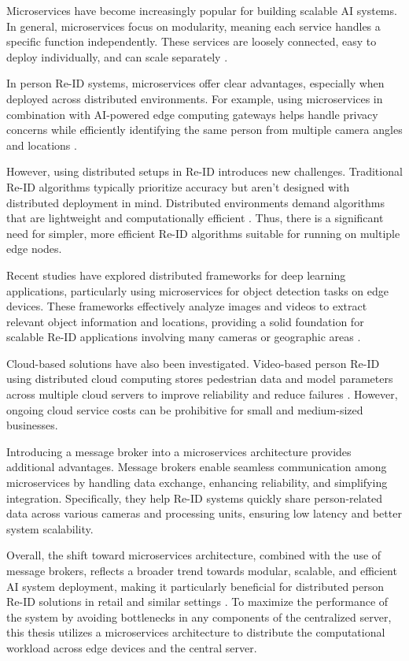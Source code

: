 \documentclass[../main.tex]{subfiles}
\begin{document}
Microservices have become increasingly popular for building scalable AI systems. In general, microservices focus on modularity, meaning each service handles a specific function independently. These services are loosely connected, easy to deploy individually, and can scale separately \cite{wiki2024_microservices}.

In person Re-ID systems, microservices offer clear advantages, especially when deployed across distributed environments. For example, using microservices in combination with AI-powered edge computing gateways helps handle privacy concerns while efficiently identifying the same person from multiple camera angles and locations \cite{mdpi2021_microservice}.

However, using distributed setups in Re-ID introduces new challenges. Traditional Re-ID algorithms typically prioritize accuracy but aren't designed with distributed deployment in mind. Distributed environments demand algorithms that are lightweight and computationally efficient \cite{ieee2015_distributed}. Thus, there is a significant need for simpler, more efficient Re-ID algorithms suitable for running on multiple edge nodes.

Recent studies have explored distributed frameworks for deep learning applications, particularly using microservices for object detection tasks on edge devices. These frameworks effectively analyze images and videos to extract relevant object information and locations, providing a solid foundation for scalable Re-ID applications involving many cameras or geographic areas \cite{mdpi2023_framework}.

Cloud-based solutions have also been investigated. Video-based person Re-ID using distributed cloud computing stores pedestrian data and model parameters across multiple cloud servers to improve reliability and reduce failures \cite{jait2022_cloud}. However, ongoing cloud service costs can be prohibitive for small and medium-sized businesses.

Introducing a message broker into a microservices architecture provides additional advantages. Message brokers enable seamless communication among microservices by handling data exchange, enhancing reliability, and simplifying integration. Specifically, they help Re-ID systems quickly share person-related data across various cameras and processing units, ensuring low latency and better system scalability.

Overall, the shift toward microservices architecture, combined with the use of message brokers, reflects a broader trend towards modular, scalable, and efficient AI system deployment, making it particularly beneficial for distributed person Re-ID solutions in retail and similar settings \cite{splunk2024}. To maximize the performance of the system by avoiding bottlenecks in any components of the centralized server, this thesis utilizes a microservices architecture to distribute the computational workload across edge devices and the central server.
\end{document}
